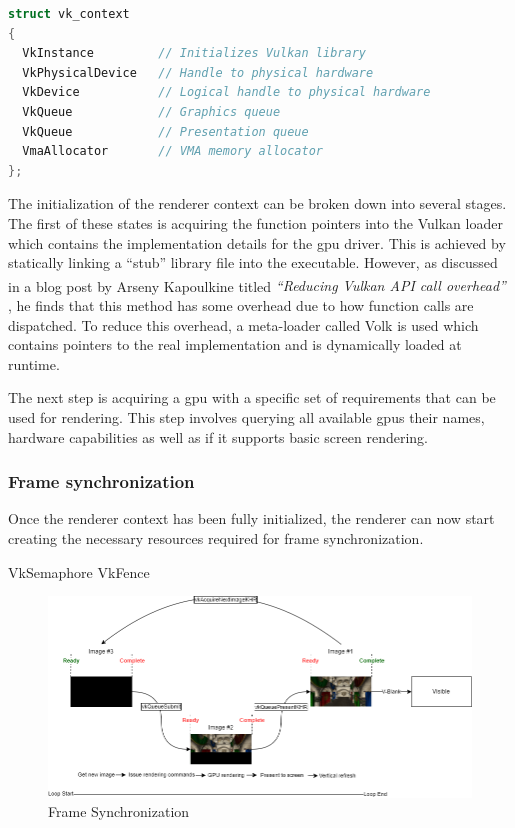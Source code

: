 \documentclass[11pt]{article}
\begin{document}
\begin{lstlisting}[language=C++]
struct vk_context
{
  VkInstance         // Initializes Vulkan library
  VkPhysicalDevice   // Handle to physical hardware
  VkDevice           // Logical handle to physical hardware
  VkQueue            // Graphics queue
  VkQueue            // Presentation queue
  VmaAllocator       // VMA memory allocator
};
\end{lstlisting}

The initialization of the renderer context can be broken down into several
stages. The first of these states is acquiring the function pointers into the
Vulkan loader which contains the implementation details for the \gls{gpu}
driver. This is achieved by statically linking a ``stub'' library file into the
executable. However, as discussed in a blog post by Arseny Kapoulkine titled
\textit{``Reducing Vulkan\textsuperscript{\textregistered} API call overhead''}
\cite{volk}, he finds that this method has some overhead due to how function
calls are dispatched. To reduce this overhead, a meta-loader called Volk is used
which contains pointers to the real implementation and is dynamically loaded at
runtime.

The next step is acquiring a \gls{gpu} with a specific set of requirements that
can be used for rendering. This step involves querying all available \glspl{gpu}
their names, hardware capabilities as well as if it supports basic screen
rendering.





\subsubsection{Frame synchronization}
Once the renderer context has been fully initialized, the renderer can now start
creating the necessary resources required for frame synchronization.



VkSemaphore
VkFence

\begin{figure}[h!]
  \centering
  \includegraphics[width=\textwidth]{images/frame_sync.png}
  \caption{Frame Synchronization}
  \label{fig:frame_sync}
\end{figure}
\end{document}

